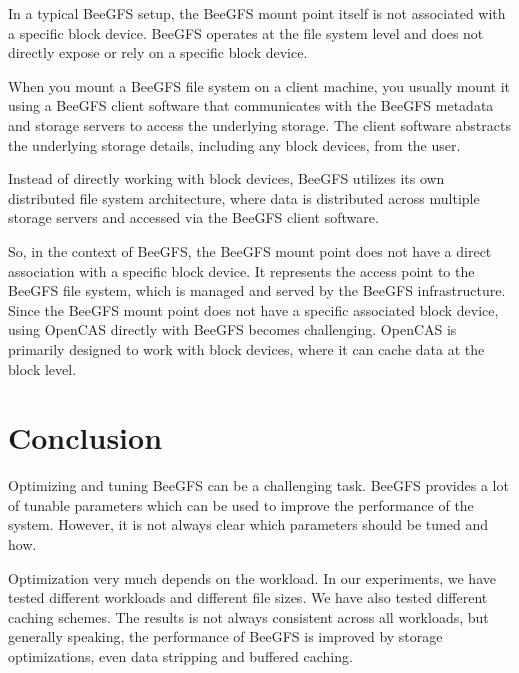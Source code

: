 \documentclass{article}
\begin{document}
In a typical BeeGFS setup, the BeeGFS mount point itself is not associated with a specific block device. BeeGFS operates at the file system level and does not directly expose or rely on a specific block device.

When you mount a BeeGFS file system on a client machine, you usually mount it using a BeeGFS client software that communicates with the BeeGFS metadata and storage servers to access the underlying storage. The client software abstracts the underlying storage details, including any block devices, from the user.

Instead of directly working with block devices, BeeGFS utilizes its own distributed file system architecture, where data is distributed across multiple storage servers and accessed via the BeeGFS client software.

So, in the context of BeeGFS, the BeeGFS mount point does not have a direct association with a specific block device. It represents the access point to the BeeGFS file system, which is managed and served by the BeeGFS infrastructure.
Since the BeeGFS mount point does not have a specific associated block device,
using OpenCAS directly with BeeGFS becomes challenging.
OpenCAS is primarily designed to work with block devices, where it can cache data at the block level.

\section{Conclusion}
Optimizing and tuning BeeGFS can be a challenging task. BeeGFS provides a lot of tunable parameters which can be used to improve the performance of the system. However, it is not always clear which parameters should be tuned and how. 

Optimization very much depends on the workload. In our experiments, we have tested different workloads and different file sizes. We have also tested different caching schemes. The results is not always consistent across all workloads, but generally speaking, the performance of BeeGFS is improved by storage optimizations, even data stripping and buffered caching. 

\clearpage
\nocite{*}
\printbibliography
\end{document}

